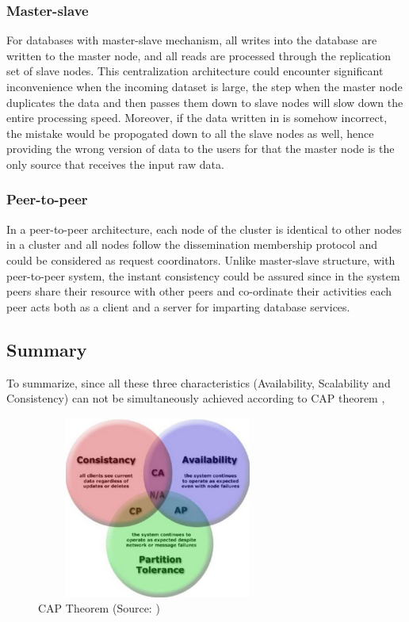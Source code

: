 \subsubsection{Master-slave}\mbox{}

For databases with master-slave mechanism, all writes into the database are written to the master node, and all reads are processed through the replication set of slave nodes. This centralization architecture could encounter significant inconvenience when the incoming dataset is large, the step when the master node duplicates the data and then passes them down to slave nodes will slow down the entire processing speed. Moreover, if the data written in is somehow incorrect, the mistake would be propogated down to all the slave nodes as well, hence providing the wrong version of data to the users for that the master node is the only source that receives the input raw data.

\subsubsection{Peer-to-peer}\mbox{}

In a peer-to-peer architecture, each node of the cluster is identical to other nodes in a cluster and all nodes follow the dissemination membership protocol and could be considered as request coordinators. Unlike master-slave structure, with peer-to-peer system, the instant consistency could be assured since in the system peers share their resource with other peers and co-ordinate their activities each peer acts both as a client and a server for imparting database services\cite{tutorial}.



\subsection{Summary}
To summarize, since all these three characteristics (Availability, Scalability and Consistency) can not be simultaneously achieved according to CAP theorem \cite{neo}, 

\begin{figure}[H]
	\includegraphics[height=6cm, width=8cm]{../../../images/cap.png}
	\caption{CAP Theorem (Source: \cite{neo})}
\end{figure}

